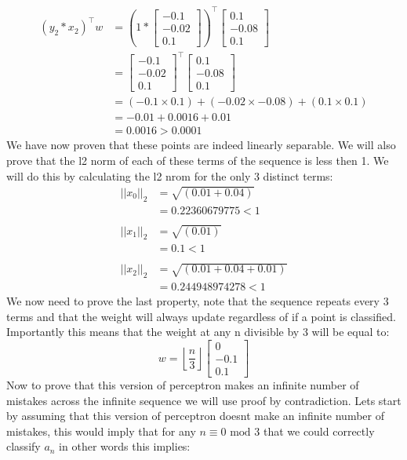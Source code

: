 \documentclass{article}
\begin{document}
\begin{titlepage}
\begin{align*} 
(y_2*x_2)^\top w &= \left(1*\begin{bmatrix}
-0.1\\
-0.02\\
0.1
\end{bmatrix}\right)^\top\begin{bmatrix}
0.1\\
-0.08\\
0.1
\end{bmatrix} \\
&= \begin{bmatrix}
-0.1\\
-0.02\\
0.1
\end{bmatrix}^\top\begin{bmatrix}
0.1\\
-0.08\\
0.1
\end{bmatrix}\\
&= (-0.1 \times 0.1) + (-0.02 \times -0.08) + (0.1 \times 0.1) \\
&= -0.01 + 0.0016 + 0.01 \\
&= 0.0016 > 0.0001
\end{align*}
We have now proven that these points are indeed linearly separable. We will also prove that the l2 norm of each of these terms of the sequence is less then 1. We will do this by calculating the l2 nrom for the only 3 distinct terms:
\begin{align*} 
|| x_0 ||_2 &= \sqrt{(0.01 + 0.04)} \\
&= 0.22360679775 < 1 \\\\
|| x_1 ||_2 &= \sqrt{(0.01)} \\
&= 0.1 < 1 \\\\
|| x_2 ||_2 &= \sqrt{(0.01 + 0.04 + 0.01)} \\
&= 0.244948974278 < 1 
\end{align*}
We now need to prove the last property, note that  the sequence repeats every 3 terms and that the weight will always update regardless of if a point is classified. Importantly this means that the weight at any n divisible by 3 will be equal to:
\[ w = \left \lfloor\frac{n}{3}\right \rfloor \begin{bmatrix}
0\\
-0.1\\
0.1
\end{bmatrix} \]
Now to prove that this version of perceptron makes an infinite number of mistakes across the infinite sequence we will use proof by contradiction. Lets start by assuming that this version of perceptron doesnt make an infinite number of mistakes, this would imply that for any $n \equiv 0\text{  mod 3}$ that we could correctly classify $a_n$ in other words this implies:

\end{titlepage}
\end{document}
